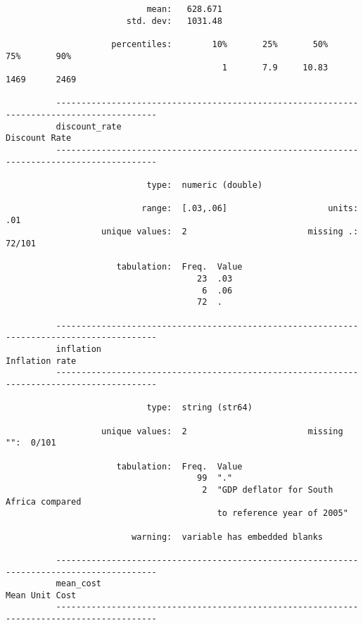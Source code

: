 \documentclass{article}
\begin{document}
\begin{verbatim}
                            mean:   628.671
                        std. dev:   1031.48
          
                     percentiles:        10%       25%       50%       75%       90%
                                           1       7.9     10.83      1469      2469
          
          ------------------------------------------------------------------------------------------
          discount_rate                                                                Discount Rate
          ------------------------------------------------------------------------------------------
          
                            type:  numeric (double)
          
                           range:  [.03,.06]                    units:  .01
                   unique values:  2                        missing .:  72/101
          
                      tabulation:  Freq.  Value
                                      23  .03
                                       6  .06
                                      72  .
          
          ------------------------------------------------------------------------------------------
          inflation                                                                   Inflation rate
          ------------------------------------------------------------------------------------------
          
                            type:  string (str64)
          
                   unique values:  2                        missing "":  0/101
          
                      tabulation:  Freq.  Value
                                      99  "."
                                       2  "GDP deflator for South Africa compared
                                          to reference year of 2005"
          
                         warning:  variable has embedded blanks
          
          ------------------------------------------------------------------------------------------
          mean_cost                                                                   Mean Unit Cost
          ------------------------------------------------------------------------------------------
          

\end{verbatim}
\end{document}
